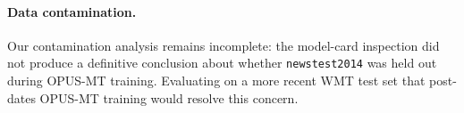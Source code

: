 \documentclass[11pt]{article}
\begin{document}
\paragraph{Data contamination.} Our contamination analysis remains incomplete: the model-card inspection did not produce a definitive conclusion about whether \texttt{newstest2014} was held out during OPUS-MT training. Evaluating on a more recent WMT test set that post-dates OPUS-MT training would resolve this concern.
 


 
\end{document}
